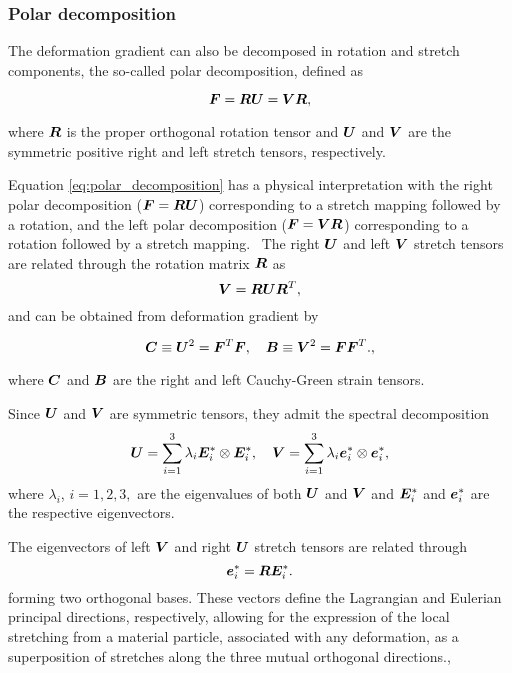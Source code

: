 \subsubsection{Polar decomposition}

The deformation gradient can also be decomposed in rotation and stretch components, the so-called polar decomposition, defined as
\begin{highlight}
    \begin{equation}
        \bm{F} = \bm{R}\bm{U} = \bm{V}\bm{R}, \label{eq:polar_decomposition}
    \end{equation}
\end{highlight}
where $\bm{R}$ is the proper orthogonal rotation tensor and $\bm{U}$ and $\bm{V}$ are the symmetric positive right and left stretch tensors, respectively.

Equation \eqref{eq:polar_decomposition} has a physical interpretation with the right polar decomposition ($\bm{F}= \bm{R}\bm{U}$) corresponding to a stretch mapping followed by a rotation, and the left polar decomposition ($\bm{F} = \bm{V}\bm{R}$) corresponding to a rotation followed by a stretch mapping.
\
The right $\bm{U}$ and left $\bm{V}$ stretch tensors are related through the rotation matrix $\bm{R}$ as
\begin{equation}
    \bm{V} = \bm{R}\bm{U}\bm{R}^T,
\end{equation}
and can be obtained from deformation gradient by
\begin{highlight}
    \begin{equation}
        \bm{C} \equiv \bm{U}^2 = \bm{F}^T \bm{F},\quad \bm{B} \equiv \bm{V}^2 = \bm{F}\bm{F}^T.,
    \end{equation}
\end{highlight}
where $\bm{C}$ and $\bm{B}$ are the right and left Cauchy-Green strain tensors.

Since $\bm{U}$ and $\bm{V}$ are symmetric tensors, they admit the spectral decomposition
\begin{equation}
    \bm{U} = \sum_{i=1}^3 \lambda_i \bm{E}_i^* \otimes \bm{E}_i^*,\quad \bm{V} = \sum_{i=1}^3 \lambda_i \bm{e}_i^*\otimes \bm{e}_i^*,
\end{equation}
where $\lambda_i$, $i=1,2,3,$ are the eigenvalues of both $\bm{U}$ and $\bm{V}$ and $\bm{E}_i^*$ and $\bm{e}_i^*$ are the respective eigenvectors.

The eigenvectors of left $\bm{V}$ and right $\bm{U}$ stretch tensors are related through
\begin{equation}
    \bm{e}_i^*= \bm{R} \bm{E}_i^*.
\end{equation}
forming two orthogonal bases.
These vectors define the Lagrangian and Eulerian principal directions, respectively, allowing for the expression of the local stretching from a material particle, associated with any deformation, as a superposition of stretches along the three mutual orthogonal directions.,


